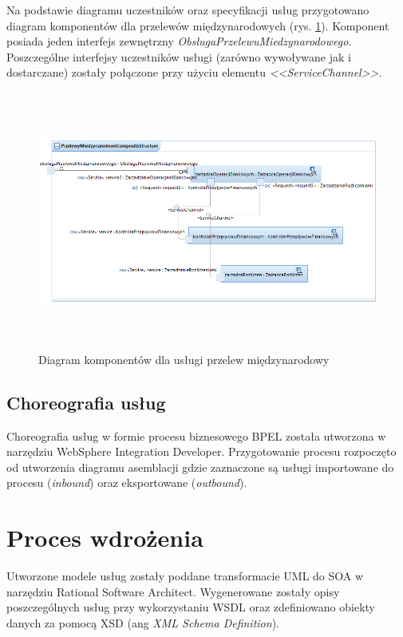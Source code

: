Na podstawie diagramu uczestników oraz specyfikacji usług przygotowano diagram komponentów dla przelewów międzynarodowych (rys. \ref{operacja_przelewu_diagram_komponentow}). Komponent posiada jeden interfejs zewnętrzny \emph{ObslugaPrzelewuMiedzynarodowego}. Poszczególne interfejsy uczestników usługi (zarówno wywoływane jak i dostarczane) zostały połączone przy użyciu elementu \emph{<<ServiceChannel>>}.

\begin{figure}[h!tbp]
\begin{centering}
\includegraphics[width=16cm, height=8.5cm]{img/przelew_miedzynarodowy_composite.png}
\caption[Diagram komponentów dla usługi przelewu międzynarodowy]{Diagram komponentów dla usługi przelew międzynarodowy}\label{operacja_przelewu_diagram_komponentow}
\end{centering}
\end{figure}

\subsection{Choreografia usług}
Choreografia usług w formie procesu biznesowego BPEL została utworzona w narzędziu WebSphere Integration Developer. Przygotowanie procesu rozpoczęto od utworzenia diagramu asemblacji gdzie zaznaczone są usługi importowane do procesu (\emph{inbound}) oraz eksportowane (\emph{outbound}).

\section{Proces wdrożenia}
Utworzone modele usług zostały poddane transformacie UML do SOA w narzędziu Rational Software Architect. Wygenerowane zostały opisy poszczególnych usług przy wykorzystaniu WSDL oraz zdefiniowano obiekty danych za pomocą XSD (ang \emph{XML Schema Definition}). 

